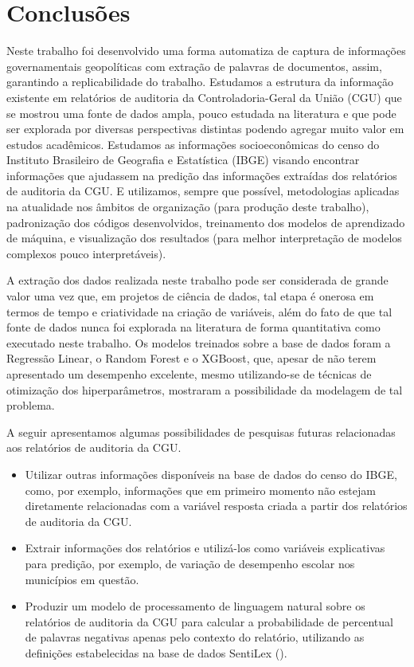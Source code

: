 \chapter{Conclusões}
\label{cap:conclusoes}

Neste trabalho foi desenvolvido uma forma automatiza de captura de informações governamentais geopolíticas com extração de palavras de documentos, assim, garantindo a replicabilidade do trabalho. Estudamos a estrutura da informação existente em relatórios de auditoria da Controladoria-Geral da União (CGU) que se mostrou uma fonte de dados ampla, pouco estudada na literatura e que pode ser explorada por diversas perspectivas distintas podendo agregar muito valor em estudos acadêmicos. Estudamos as informações socioeconômicas do censo do Instituto Brasileiro de Geografia e Estatística (IBGE) visando encontrar informações que ajudassem na predição das informações extraídas dos relatórios de auditoria da CGU. E utilizamos, sempre que possível, metodologias aplicadas na atualidade nos âmbitos de organização (para produção deste trabalho), padronização dos códigos desenvolvidos, treinamento dos modelos de aprendizado de máquina, e visualização dos resultados (para melhor interpretação de modelos complexos pouco interpretáveis).

A extração dos dados realizada neste trabalho pode ser considerada de grande valor uma vez que, em projetos de ciência de dados, tal etapa é onerosa em termos de tempo e criatividade na criação de variáveis, além do fato de que tal fonte de dados nunca foi explorada na literatura de forma quantitativa como executado neste trabalho. Os modelos treinados sobre a base de dados foram a Regressão Linear, o Random Forest e o XGBoost, que, apesar de não terem apresentado um desempenho excelente, mesmo utilizando-se de técnicas de otimização dos hiperparâmetros, mostraram a possibilidade da modelagem de tal problema.

A seguir apresentamos algumas possibilidades de pesquisas futuras relacionadas aos relatórios de auditoria da CGU.

\begin{itemize}
	\item Utilizar outras informações disponíveis na base de dados do censo do IBGE, como, por exemplo, informações que em primeiro momento não estejam diretamente relacionadas com a variável resposta criada a partir dos relatórios de auditoria da CGU.
	\item Extrair informações dos relatórios e utilizá-los como variáveis explicativas para predição, por exemplo, de variação de desempenho escolar nos municípios em questão.
	\item Produzir um modelo de processamento de linguagem natural sobre os relatórios de auditoria da CGU para calcular a probabilidade de percentual de palavras negativas apenas pelo contexto do relatório, utilizando as definições estabelecidas na base de dados SentiLex (\citet{Silva2012}).
\end{itemize}

